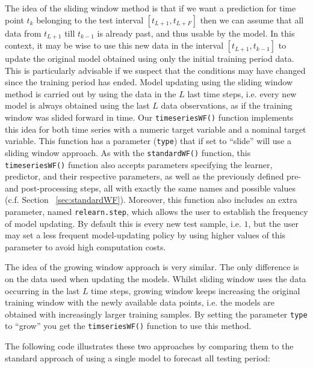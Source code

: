 \documentclass[10pt,a4paper]{article}\usepackage[]{graphicx}\usepackage[]{color}
\begin{document}
The idea of the
sliding window method is that if we want a prediction for time point
$t_k$ belonging to the test interval $[t_{L+1},t_{L+F}]$ then we can
assume that all data from $t_{L+1}$ till $t_{k-1}$ is already past,
and thus usable by the model. In this context, it may be wise to use
this new data in the interval $[t_{L+1},t_{k-1}]$ to update the
original model obtained using only the initial training period data. This is
particularly advisable if we suspect that the conditions may have
changed since the training period has ended. Model updating using the
sliding window method is carried out by using the data in the $L$ last
time steps, i.e. every new model is always obtained using the last $L$
data observations, as if the training window was slided forward in
time. Our \texttt{timeseriesWF()} function implements this idea for
both time series with a numeric target variable and a nominal target
variable. This function has a parameter (\texttt{type}) that if set to
``slide'' will use a sliding window approach. As with the
\texttt{standardWF()} function, this \texttt{timeseriesWF()} function
also accepts parameters specifying the learner, predictor, 
and their respective parameters, as well as the previously defined pre- and post-processing steps, all with exactly the same names and possible values (c.f. Section ~\ref{sec:standardWF}). Moreover, this function also includes
an extra parameter, named \texttt{relearn.step}, which allows the user
to establish the frequency of model updating. By default this is every
new test sample, i.e. $1$, but the user may set a less frequent
model-updating policy by using higher values of this parameter to avoid high computation costs. 

The
idea of the growing window approach is very similar. The only difference
is on the data used when updating the models. Whilst sliding window
uses the data occurring in the last $L$ time steps, growing window
keeps increasing the original training window with the newly available
data points, i.e. the models are obtained with increasingly larger
training samples. By setting the parameter \texttt{type} to ``grow''
you get the \texttt{timseriesWF()} function to use this method.

The following code illustrates these two approaches by comparing them to the standard approach of using a single model to forecast all testing period:
\end{document}

